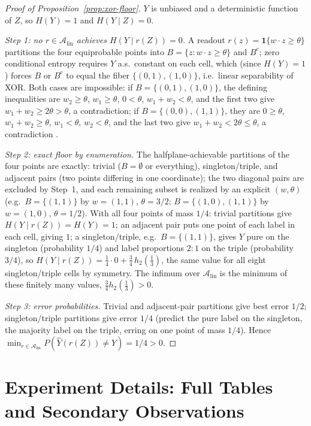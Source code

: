 \documentclass[twocolumn,10pt]{article}
\theoremstyle{definition}
\theoremstyle{remark}
\newcommand{\cA}{\mathcal{A}}
\newcommand{\Alin}{\cA_{\mathrm{lin}}}
\newcommand{\hb}{h_2}
\begin{document}
\begin{proof}[Proof of Proposition~\ref{prop:xor-floor}]
$Y$ is unbiased and a deterministic function of $Z$, so $H(Y) = 1$ and
$H(Y \mid Z) = 0$.

\emph{Step 1: no $r \in \Alin$ achieves $H(Y \mid r(Z)) = 0$.} A readout
$r(z) = \mathbf 1\{w \cdot z \ge \theta\}$ partitions the four equiprobable
points into $B = \{z : w \cdot z \ge \theta\}$ and $B^c$; zero conditional
entropy requires $Y$ a.s.\ constant on each cell, which (since $H(Y) = 1$)
forces $B$ or $B^c$ to equal the fiber $\{(0,1),(1,0)\}$, i.e.\ linear
separability of XOR. Both cases are impossible: if $B = \{(0,1),(1,0)\}$,
the defining inequalities are $w_2 \ge \theta$, $w_1 \ge \theta$,
$0 < \theta$, $w_1 + w_2 < \theta$, and the first two give
$w_1 + w_2 \ge 2\theta > \theta$, a contradiction; if
$B = \{(0,0),(1,1)\}$, they are $0 \ge \theta$, $w_1 + w_2 \ge \theta$,
$w_1 < \theta$, $w_2 < \theta$, and the last two give
$w_1 + w_2 < 2\theta \le \theta$, a contradiction \cite{minskypapert}.

\emph{Step 2: exact floor by enumeration.} The halfplane-achievable
partitions of the four points are exactly: trivial ($B = \emptyset$ or
everything), singleton/triple, and adjacent pairs (two points differing in
one coordinate); the two diagonal pairs are excluded by Step~1, and each
remaining subset is realized by an explicit $(w, \theta)$ (e.g.\
$B = \{(1,1)\}$ by $w = (1,1)$, $\theta = 3/2$; $B = \{(1,0),(1,1)\}$ by
$w = (1,0)$, $\theta = 1/2$). With all four points of mass $1/4$: trivial
partitions give $H(Y \mid r(Z)) = H(Y) = 1$; an adjacent pair puts one
point of each label in each cell, giving $1$; a singleton/triple, e.g.\
$B = \{(1,1)\}$, gives $Y$ pure on the singleton (probability $1/4$) and
label proportions $2{:}1$ on the triple (probability $3/4$), so
$H(Y \mid r(Z)) = \tfrac14 \cdot 0 + \tfrac34\, \hb(\tfrac13)$, the same
value for all eight singleton/triple cells by symmetry. The infimum over
$\Alin$ is the minimum of these finitely many values,
$\tfrac34 \hb(\tfrac13) > 0$.

\emph{Step 3: error probabilities.} Trivial and adjacent-pair partitions
give best error $1/2$; singleton/triple partitions give error $1/4$
(predict the pure label on the singleton, the majority label on the triple,
erring on one point of mass $1/4$). Hence
$\min_{r \in \Alin} P(\hat Y(r(Z)) \neq Y) = 1/4 > 0$.
\end{proof}

\section{Experiment Details: Full Tables and Secondary Observations}
\label{app:expdetails}
\end{document}
